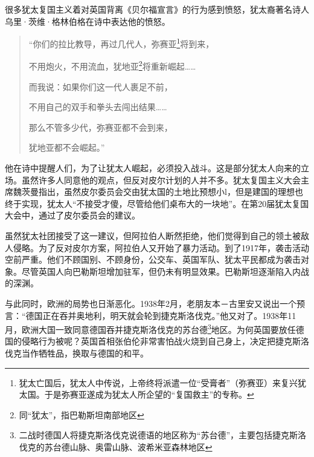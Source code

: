 \documentclass{article}
\begin{document}
很多犹太复国主义着对英国背离《贝尔福宣言》的行为感到愤怒，犹太裔著名诗人乌里·茨维·格林伯格在诗中表达他的愤怒。
\begin{quote}
    “你们的拉比教导，再过几代人，弥赛亚\footnote[1]{犹太亡国后，犹太人中传说，上帝终将派遣一位“受膏者”（弥赛亚）来复兴犹太国。于是弥赛亚遂成为犹太人所企望的“复国救主”的专称。}将到来，

    不用炮火，不用流血，犹地亚\footnote{同“犹太”，指巴勒斯坦南部地区}将重新崛起……

    而我说：如果你们这一代人裹足不前，

    不用自己的双手和拳头去闯出结果……

    那么不管多少代，弥赛亚都不会到来，

    犹地亚都不会崛起。”
\end{quote}
他在诗中提醒人们，为了让犹太人崛起，必须投入战斗。这是部分犹太人向来的立场。虽然许多人同意他的观点，但反对皮尔计划的人并不多。犹太复国主义大会主席魏茨曼指出，虽然皮尔委员会交由犹太国的土地比预想小l，但是建国的理想也终于实现，犹太人“不接受才傻，尽管给他们桌布大的一块地”。在第20届犹太复国大会中，通过了皮尔委员会的建议。

虽然犹太社团接受了这一建议，但阿拉伯人断然拒绝，他们觉得到自己的领土被敌人侵略。为了反对皮尔方案，阿拉伯人又开始了暴力活动。到了1917年，袭击活动空前严重。他们不顾国别、不顾身份，公交车、英国军队、犹太平民都成为袭击对象。尽管英国人向巴勒斯坦增加驻军，但仍未有明显效果。巴勒斯坦逐渐陷入内战的深渊。

与此同时，欧洲的局势也日渐恶化。1938年2月，老朋友本－古里安又说出一个预言：“德国正在吞并奥地利，明天就会轮到捷克斯洛伐克。”他又对了。1938年11月，欧洲大国一致同意德国吞并捷克斯洛伐克的苏台德\footnote[1]{二战时德国人将捷克斯洛伐克说德语的地区称为“苏台德”，主要包括捷克斯洛伐克的苏台德山脉、奥雷山脉、波希米亚森林地区}地区。为何英国要放任德国的侵略行为被呢？英国首相张伯伦非常害怕战火烧到自己身上，决定把捷克斯洛伐克当作牺牲品，换取与德国的和平。
\end{document}
